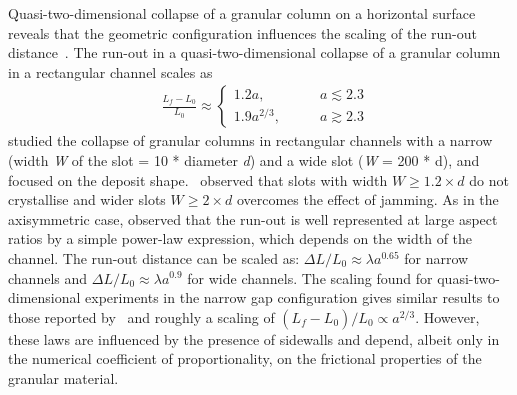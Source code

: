 
Quasi-two-dimensional collapse of a granular column on a horizontal 
surface reveals that the geometric configuration influences the scaling of the 
run-out distance~\citep{Lajeunesse2005}. The run-out in a 
quasi-two-dimensional collapse of a granular column in a rectangular channel 
scales as 
\begin{align}
& \frac{\textit{L}_{\textit{f}}- 
\textit{L}_{\textit{0}}}{\textit{L}_{\textit{0}}} \approx
\begin{cases} 
1.2\textit{a}, \qquad &\textit{a} \lesssim 2.3 \\
1.9\textit{a}^{2/3}, \qquad &\textit{a} \gtrsim 2.3
\end{cases}
\end{align} 
%
\citet{Balmforth2005} studied the collapse of granular columns in rectangular 
channels with a narrow (width \textit{W} of the slot = 10 * diameter 
\textit{d}) and a wide slot (\textit{W} = 200 * d), and focused on the deposit 
shape.~\citet{Lacaze2008} observed that slots with width $W \ge1.2 \times d$ 
do not crystallise and wider slots $W \ge 2 \times d$ overcomes the effect 
of jamming. As in the axisymmetric case, \citet{Balmforth2005} observed that 
the run-out is well represented at large aspect ratios by a 
simple power-law expression, which depends on the width of the channel. The 
run-out distance can be scaled as: $\Delta \textit{L}/\textit{L}_{\textit{0}} 
\approx \lambda \textit{a}^{0.65}$ for narrow channels and $\Delta 
\textit{L}/\textit{L}_{\textit{0}} \approx \lambda \textit{a}^{0.9}$ for wide 
channels. The scaling found for quasi-two-dimensional experiments in the narrow 
gap configuration gives similar results to those reported by~\citet{Lube2005} 
and roughly a scaling of $({\textit{L}_{\textit{f}} - 
\textit{L}_{\textit{0}}})/\textit{L}_{\textit{0}} \propto \textit{a}^{2/3}$. 
However, these laws are influenced by the presence of sidewalls and depend, 
albeit only in the numerical coefficient of proportionality, on the frictional 
properties of the granular material. 

